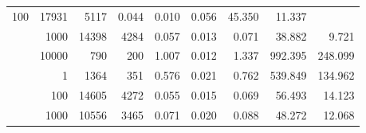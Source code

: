 \begin{table}
\begin{tabular}{rrrrrrrrr}
					\multirow{ 1 }{*}{ 100 } &
					
						
							    
							     17931  & 5117  
	                           & 0.044 & 0.010 & 0.056
	                           & 45.350 & 11.337  \\
	                
	            
					 &  
					 
					\multirow{ 1 }{*}{ 1000 } &
					
						
							    
							     14398  & 4284  
	                           & 0.057 & 0.013 & 0.071
	                           & 38.882 & 9.721  \\
	                
	            
					 &  
					 
					\multirow{ 1 }{*}{ 10000 } &
					
						
							    
							     790  & 200  
	                           & 1.007 & 0.012 & 1.337
	                           & 992.395 & 248.099  \\
	                
	            
	        
				\noalign{\smallskip}\hline
				\multirow{ 4 }{*}{ 250000 } &
				
					
					 
					\multirow{ 1 }{*}{ 1 } &
					
						
							    
							     1364  & 351  
	                           & 0.576 & 0.021 & 0.762
	                           & 539.849 & 134.962  \\
	                
	            
					 &  
					 
					\multirow{ 1 }{*}{ 100 } &
					
						
							    
							     14605  & 4272  
	                           & 0.055 & 0.015 & 0.069
	                           & 56.493 & 14.123  \\
	                
	            
					 &  
					 
					\multirow{ 1 }{*}{ 1000 } &
					
						
							    
							     10556  & 3465  
	                           & 0.071 & 0.020 & 0.088
	                           & 48.272 & 12.068  \\
	                

\end{tabular}
\end{table}
